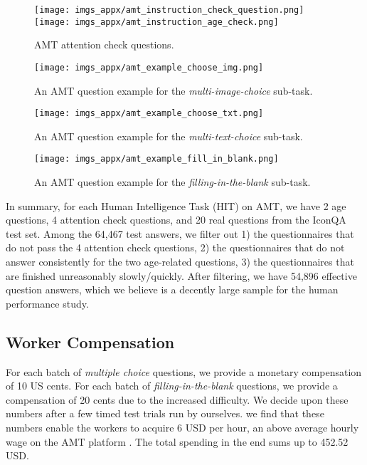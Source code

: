 \documentclass{article}
\begin{document}
\begin{figure*}[t!]
\centering 
    \texttt{[image: imgs\_appx/amt\_instruction\_check\_question.png]}
    \texttt{[image: imgs\_appx/amt\_instruction\_age\_check.png]}
    \caption{AMT attention check questions.}
    \label{fig:amt_check_ques}
\end{figure*}


\begin{figure*}[t!]
\centering 
\texttt{[image: imgs\_appx/amt\_example\_choose\_img.png]}
    \caption{An AMT question example for the \textit{multi-image-choice} sub-task.}
    \label{fig:amt_example_choose_img}
\end{figure*}

\begin{figure*}[t!]
\centering 
    \texttt{[image: imgs\_appx/amt\_example\_choose\_txt.png]}
    \caption{An AMT question example for the \textit{multi-text-choice} sub-task.}
    \label{fig:amt_example_choose_txt}
\end{figure*}

\begin{figure*}[t!]
\centering 
    \texttt{[image: imgs\_appx/amt\_example\_fill\_in\_blank.png]}
    \caption{An AMT question  example for the \textit{filling-in-the-blank} sub-task.}
    \label{fig:amt_example_fill_in_blank}
\end{figure*}



In summary, for each Human Intelligence Task (HIT) on AMT, we have 2 age questions, 4 attention check questions, and 20 real questions from the IconQA test set. Among the 64,467 test answers, we filter out 1) the questionnaires that do not pass the 4 attention check questions, 2) the questionnaires that do not answer consistently for the two age-related questions, 3) the questionnaires that are finished unreasonably slowly/quickly. After filtering, we have 54,896 effective question answers, which we believe is a decently large sample for the human performance study.\par

\subsection{Worker Compensation}
\label{app:compensation}

For each batch of \textit{multiple choice} questions, we provide a monetary compensation of 10 US cents. For each batch of \textit{filling-in-the-blank} questions, we provide a compensation of 20 cents due to the increased difficulty. We decide upon these numbers after a few timed test trials run by ourselves. we find that these numbers enable the workers to acquire 6 USD per hour, an above average hourly wage on the AMT platform \cite{hara2018data}. The total spending in the end sums up to 452.52 USD.
\end{document}
